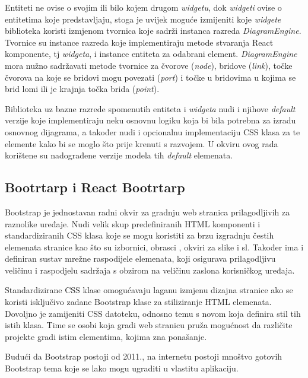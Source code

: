 \documentclass[times, utf8, diplomski, numeric]{fer}
\newcommand{\razmakp}{\vspace{18pt}}
\newcommand{\razmaks}{\vspace{10pt}}
\begin{document}
Entiteti ne ovise o svojim ili bilo kojem drugom \emph{widgetu}, dok \emph{widgeti} ovise o entitetima koje predstavljaju, stoga je uvijek moguće izmijeniti koje \emph{widgete} biblioteka koristi izmjenom tvornica koje sadrži instanca razreda \emph{DiagramEngine}.
Tvornice su instance razreda koje implementiraju metode stvaranja React komponente, tj \emph{widgeta}, i instance entiteta za odabrani element.
\emph{DiagramEngine} mora nužno sadržavati metode tvornice za čvorove (\emph{node}), bridove (\emph{link}), točke čvorova na koje se bridovi mogu povezati (\emph{port}) i točke u bridovima u kojima se brid lomi ili je krajnja točka brida (\emph{point}).

Biblioteka uz bazne razrede spomenutih entiteta i \emph{widgeta} nudi i njihove \emph{default} verzije koje implementiraju neku osnovnu logiku koja bi bila potrebna za izradu osnovnog dijagrama, a također nudi i opcionalnu implementaciju CSS klasa za te elemente kako bi se moglo što prije krenuti s razvojem\citep{storm_rd}.
U okviru ovog rada korištene su nadograđene verzije modela tih \emph{default} elemenata.


\razmaks
\subsection{Bootrtarp i React Bootrtarp}

Bootstrap je jednostavan radni okvir za gradnju web stranica prilagodljivih za raznolike uređaje.
Nudi velik skup predefiniranih HTML komponenti i standardiziranih CSS klasa koje se mogu koristiti za brzu izgradnju čestih elemenata stranice kao što su izbornici, obrasci , okviri za slike i sl.
Također ima i definiran sustav mrežne raspodijele elemenata, koji osigurava prilagodljivu veličinu i raspodjelu sadržaja s obzirom na veličinu zaslona korisničkog uređaja.

Standardizirane CSS klase omogućavaju laganu izmjenu dizajna stranice ako se koristi isključivo zadane Bootstrap klase za stiliziranje HTML elemenata.
Dovoljno je zamijeniti CSS datoteku, odnosno temu s novom koja definira stil tih istih klasa.
Time se osobi koja gradi web stranicu pruža mogućnost da različite projekte gradi istim elementima, kojima zna ponašanje.

Budući da Bootstrap postoji od 2011.\citep{wiki_bs}, na internetu postoji mnoštvo gotovih Bootstrap tema koje se lako mogu ugraditi u vlastitu aplikaciju.

\razmakp
\end{document}
